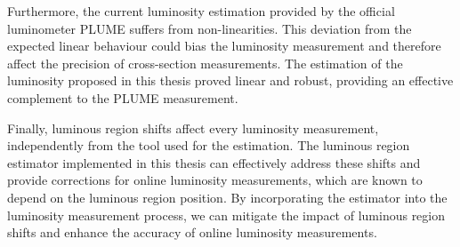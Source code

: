 Furthermore, the current luminosity estimation provided by the official luminometer PLUME suffers from non-linearities. This deviation from the expected linear behaviour could bias the luminosity measurement and therefore affect the precision of cross-section measurements. The estimation of the luminosity proposed in this thesis proved linear and robust, providing an effective complement to the PLUME measurement.

Finally, luminous region shifts affect every luminosity measurement, independently from the tool used for the estimation. The luminous region estimator implemented in this thesis can effectively address these shifts and provide corrections for online luminosity measurements, which are known to depend on the luminous region position. By incorporating the estimator into the luminosity measurement process, we can mitigate the impact of luminous region shifts and enhance the accuracy of online luminosity measurements.
